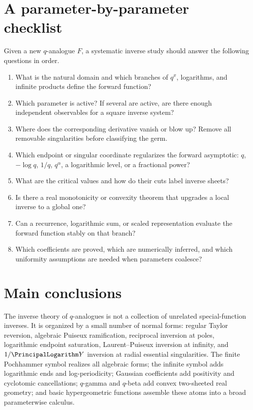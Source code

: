 \documentclass[11pt,a4paper,oneside,openany]{book}
\theoremstyle{definition}
\theoremstyle{remark}
\begin{document}
\section{A parameter-by-parameter checklist}

Given a new \(q\)-analogue \(F\), a systematic inverse study should answer the
following questions in order.

\begin{enumerate}[label=\arabic*.]
\item What is the natural domain and which branches of \(q^x\), logarithms,
and infinite products define the forward function?
\item Which parameter is active?  If several are active, are there enough
independent observables for a square inverse system?
\item Where does the corresponding derivative vanish or blow up?  Remove all
removable singularities before classifying the germ.
\item Which endpoint or singular coordinate regularizes the forward
asymptotic: \(q\), \(-\log q\), \(1/q\), \(q^\alpha\), a logarithmic level, or
a fractional power?
\item What are the critical values and how do their cuts label inverse sheets?
\item Is there a real monotonicity or convexity theorem that upgrades a local
inverse to a global one?
\item Can a recurrence, logarithmic sum, or scaled representation evaluate the
forward function stably on that branch?
\item Which coefficients are proved, which are numerically inferred, and which
uniformity assumptions are needed when parameters coalesce?
\end{enumerate}

\section{Main conclusions}

The inverse theory of \(q\)-analogues is not a collection of unrelated
special-function inverses.  It is organized by a small number of normal forms:
regular Taylor reversion, algebraic Puiseux ramification, reciprocal inversion
at poles, logarithmic endpoint saturation, Laurent--Puiseux inversion at
infinity, and \(1/\PrincipalLogarithm Y\) inversion at radial essential singularities.  The
finite Pochhammer symbol realizes all algebraic forms; the infinite symbol
adds logarithmic ends and log-periodicity; Gaussian coefficients add
positivity and cyclotomic cancellations; \(q\)-gamma and \(q\)-beta add
convex two-sheeted real geometry; and basic hypergeometric functions assemble
these atoms into a broad parameterwise calculus.
\end{document}
